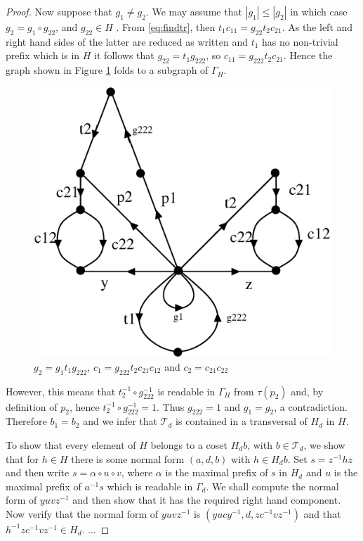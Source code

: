 \documentclass[a4paper,12pt]{article}
\renewcommand{\a}{\alpha }
\newcommand{\G}{\Gamma }
\renewcommand{\t}{\tau }
\numberwithin{equation}{section}
\numberwithin{figure}{section}
\newcommand{\cT}{\mathcal{T}}
\begin{document}
{\begin{proof}
Now suppose that $g_1\neq g_2$. We may assume that $|g_1|\le |g_2|$ in which case $g_2=g_1\circ g_{22}$, and $g_{22}\in H$ . 
From \eqref{eq:findtr}, then $t_1c_{11}=g_{22}t_2c_{21}$. As the left and right hand sides of the
latter are reduced as written and $t_1$ has no non-trivial prefix which is in $H$ it follows that
$g_{22}=t_1g_{222}$, so $c_{11}=g_{222}t_2c_{21}$. Hence the graph shown in Figure \ref{fig:transv2} folds to 
a subgraph of $\G_H$. 
\begin{figure}
\begin{center}
\includegraphics[scale=0.6]{transv2.eps}
\caption{$g_2=g_1t_1g_{222}$, $c_1=g_{222}t_2c_{21}c_{12}$ and $c_2=c_{21}c_{22}$}\label{fig:transv2}
\end{center}
\end{figure}
However, this means that $t_2^{-1}\circ g_{222}^{-1}$ is readable in $\G_H$ from $\t(p_2)$ and, by definition of $p_2$,
 hence $t_2^{-1}\circ g_{222}^{-1}=1$. Thus $g_{222}=1$ and $g_1=g_2$, a contradiction.
Therefore $b_1=b_2$ and we infer that $\cT_d$ is contained in a transversal of $H_d$ in $H$.

To show that every element of $H$ belongs to a coset $H_db$, with $b\in \cT_d$, we show that for  $h\in H$ 
there is some normal form $(a,d,b)$ with $h\in H_db$. Set  
$s=z^{-1}hz$ and then write $s=\a\circ u\circ v$, where $\a$ is the maximal prefix of $s$ in $H_d$ and $u$ is the maximal prefix of $a^{-1}s$ which is readable in $\G_d$.
We shall compute the normal form of  $yuvz^{-1}$ and then show that it has the required right hand component. 
 Now verify that the normal form of $yuvz^{-1}$ is $(yucy^{-1}, d, zc^{-1}vz^{-1})$ and that 
$h^{-1}zc^{-1}vz^{-1}\in H_d$. ...
 

\end{proof}}
\end{document}
